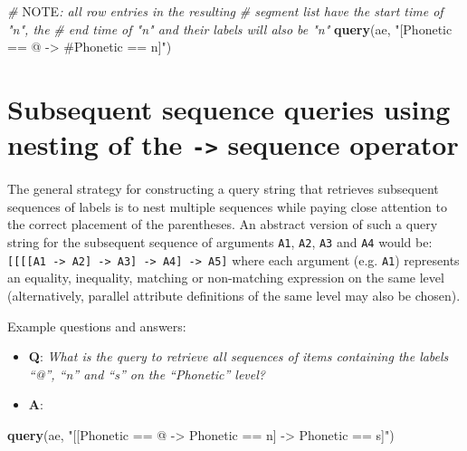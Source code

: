 \documentclass[]{book}
\newenvironment{Shaded}{\begin{snugshade}}{\end{snugshade}}
\newcommand{\AlertTok}[1]{\textcolor[rgb]{0.94,0.16,0.16}{#1}}
\newcommand{\CommentTok}[1]{\textcolor[rgb]{0.56,0.35,0.01}{\textit{#1}}}
\newcommand{\KeywordTok}[1]{\textcolor[rgb]{0.13,0.29,0.53}{\textbf{#1}}}
\newcommand{\NormalTok}[1]{#1}
\newcommand{\StringTok}[1]{\textcolor[rgb]{0.31,0.60,0.02}{#1}}
\providecommand{\tightlist}{%
  \setlength{\itemsep}{0pt}\setlength{\parskip}{0pt}}
\theoremstyle{definition}
\theoremstyle{definition}
\theoremstyle{definition}
\theoremstyle{remark}
\begin{document}
\begin{Shaded}
\begin{Highlighting}[]
\CommentTok{# }\AlertTok{NOTE}\CommentTok{: all row entries in the resulting}
\CommentTok{# segment list have the start time of "n", the}
\CommentTok{# end time of "n" and their labels will also be "n"}
\KeywordTok{query}\NormalTok{(ae, }\StringTok{"[Phonetic == @ -> #Phonetic == n]"}\NormalTok{)}
\end{Highlighting}
\end{Shaded}

\hypertarget{subsequent-sequence-queries-using-nesting-of-the---sequence-operator}{%
\section{\texorpdfstring{Subsequent sequence queries using nesting of
the \texttt{-\textgreater{}} sequence
operator}{Subsequent sequence queries using nesting of the -\textgreater{} sequence operator}}\label{subsequent-sequence-queries-using-nesting-of-the---sequence-operator}}

The general strategy for constructing a query string that retrieves
subsequent sequences of labels is to nest multiple sequences while
paying close attention to the correct placement of the parentheses. An
abstract version of such a query string for the subsequent sequence of
arguments \texttt{A1}, \texttt{A2}, \texttt{A3} and \texttt{A4} would
be:
\texttt{{[}{[}{[}{[}A1\ -\textgreater{}\ A2{]}\ -\textgreater{}\ A3{]}\ -\textgreater{}\ A4{]}\ -\textgreater{}\ A5{]}}
where each argument (e.g. \texttt{A1}) represents an equality,
inequality, matching or non-matching expression on the same level
(alternatively, parallel attribute definitions of the same level may
also be chosen).

Example questions and answers:

\begin{itemize}
\tightlist
\item
  \textbf{Q}: \emph{What is the query to retrieve all sequences of items
  containing the labels ``@'', ``n'' and ``s'' on the ``Phonetic''
  level?}
\item
  \textbf{A}:
\end{itemize}

\begin{Shaded}
\begin{Highlighting}[]
\KeywordTok{query}\NormalTok{(ae, }\StringTok{"[[Phonetic == @ -> Phonetic == n] -> Phonetic == s]"}\NormalTok{)}
\end{Highlighting}
\end{Shaded}
\end{document}
